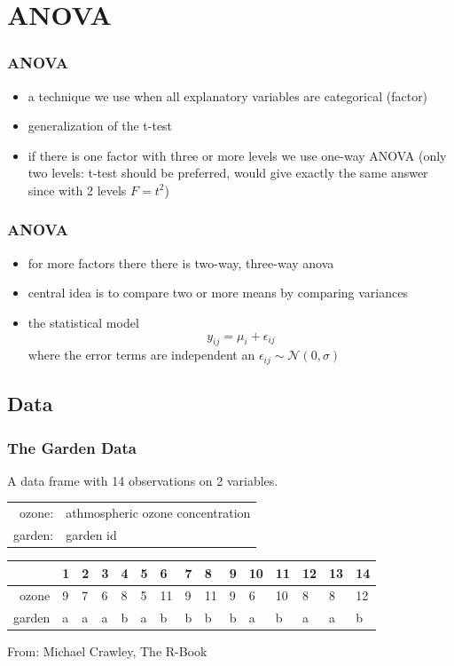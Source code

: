 \section{ANOVA}
\begin{frame}\frametitle{ANOVA}
  \begin{itemize}  
  \item a technique we use when all explanatory variables are categorical (factor)
  \item generalization of the t-test
  \item if there is one factor with three or more levels we use one-way ANOVA (only two levels: t-test should be preferred, would give exactly the same answer since with 2 levels $F=t^2$)
  \end{itemize}
\end{frame}

\begin{frame}\frametitle{ANOVA}
  \begin{itemize}  
  \item for more factors there there is two-way, three-way anova 
  \item central idea is to compare two or more means by comparing variances
  \item the statistical model $$y_{ij} = \mu_i + \epsilon_{ij}$$ where the error terms are independent an $\epsilon_{ij} \sim \mathcal{N}(0,\sigma)$ 
  \end{itemize}
\end{frame}

\subsection{Data}
\begin{frame}[fragile]\frametitle{The Garden Data}
A data frame with 14 observations on 2 variables. 
\begin{center}
\begin{tabular}{@{} >{\ttfamily}r l}
  ozone: & athmospheric ozone concentration               \\
  garden: & garden id                              \\
\end{tabular}

\vspace*{1cm}

\begin{table}[ht]
\small
\centering
\begin{tabular}{rllllllllllllll}
  \hline
 & 1 & 2 & 3 & 4 & 5 & 6 & 7 & 8 & 9 & 10 & 11 & 12 & 13 & 14 \\ 
  \hline
ozone &  9 &  7 &  6 &  8 &  5 & 11 &  9 & 11 &  9 &  6 & 10 &  8 &  8 & 12 \\ 
  garden & a & a & a & b & a & b & b & b & b & a & b & a & a & b \\ 
   \hline
\end{tabular}
\end{table}
\end{center}
From: Michael Crawley, The R-Book

\end{frame}

